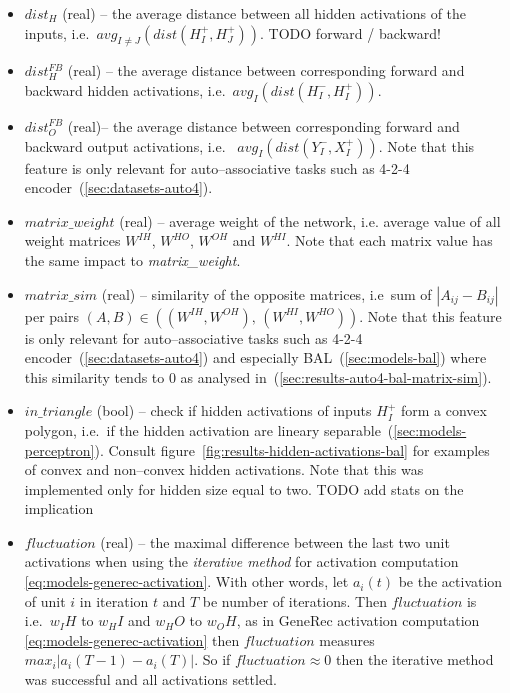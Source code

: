 \begin{itemize} 
\item $dist_{H}$ (real) -- the average distance between all hidden activations of the inputs, i.e.~$avg_{I \neq J}\left(dist(H_I^{+},H_J^{+})\right)$. TODO forward / backward! 

\label{sec:our-dist-h-fb}
\item $dist_{H}^{FB}$ (real) -- the average distance between corresponding forward and backward hidden activations, i.e.~$avg_{I}\left(dist(H_I^{-},H_I^{+})\right)$.

\item	$dist_{O}^{FB}$ (real)-- the average distance between corresponding forward and backward output activations, i.e.~  $avg_{I}\left(dist(Y_I^{-},X_I^{+})\right)$. Note that this feature is only relevant for auto--associative tasks such as 4-2-4 encoder~(\ref{sec:datasets-auto4}). 

\item $matrix\_weight$ (real) -- average weight of the network, i.e. average value of all weight matrices $W^{IH}$, $W^{HO}$, $W^{OH}$ and $W^{HI}$. Note that each matrix value has the same impact to \emph{matrix\_weight}. 

\item $matrix\_sim$ (real) -- similarity of the opposite matrices, i.e~sum of $|A_{ij} - B_{ij}|$ per pairs $(A,B) \in ((W^{IH}, W^{OH}),\, (W^{HI}, W^{HO}))$. Note that this feature is only relevant for auto--associative tasks such as 4-2-4 encoder~(\ref{sec:datasets-auto4}) and especially BAL~(\ref{sec:models-bal}) where this similarity tends to 0 as analysed in~(\ref{sec:results-auto4-bal-matrix-sim}). 

\label{sec:our-in-triangle}
\item $in\_triangle$ (bool) -- check if hidden activations of inputs  $H_I^{+}$ form a convex polygon, i.e.~if the hidden activation are lineary separable~(\ref{sec:models-perceptron}). Consult figure~\ref{fig:results-hidden-activations-bal} for examples of convex and non--convex hidden activations. Note that this was implemented only for hidden size equal to two. TODO add stats on the implication 

\label{eq:our-fluctuation}
\item $fluctuation$ (real) -- the maximal difference between the last two unit activations when using the \emph{iterative method} for activation computation \ref{eq:models-generec-activation}. With other words, let $a_i(t)$ be the activation of unit $i$ in iteration $t$ and $T$ be number of iterations. Then $fluctuation$ is i.e.~$w_IH$ to $w_HI$ and $w_HO$ to $w_OH$, as in GeneRec activation computation \ref{eq:models-generec-activation} then $fluctuation$ measures $max_i|a_i(T-1) - a_i(T)|$. So if $fluctuation \approx 0$ then the iterative method was successful and all activations settled.
\end{itemize} 

